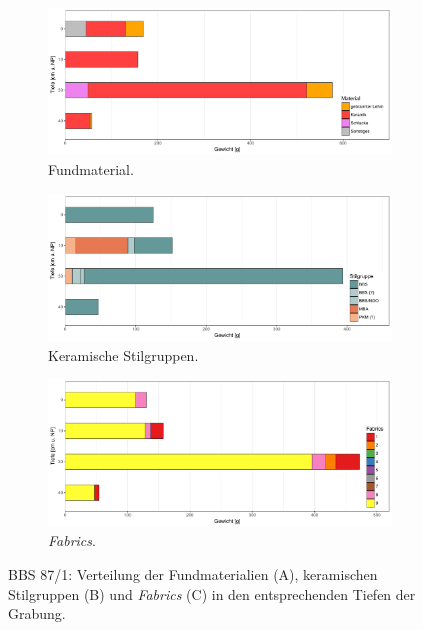 \begin{figure}[p]
	\centering
	\begin{subfigure}[t]{\textwidth}
		\centering
		\includegraphics[width=\textwidth]{fig/9-6_BBS87-1_VerteilungFunde_R.pdf}
		\caption{Fundmaterial.\vspace{1em}}
		\label{fig:BBS87-1_VerteilungFunde}
	\end{subfigure}
	\begin{subfigure}[t]{\textwidth}
		\centering
		\includegraphics[width=\textwidth]{fig/9-6_BBS87-1_KeramikStilgruppen_R.pdf}
		\caption{Keramische Stilgruppen.\vspace{1em}}
		\label{fig:BBS87-1_VerteilungStilgr}
	\end{subfigure}
	\begin{subfigure}[t]{\textwidth}
		\centering
		\includegraphics[width=\textwidth]{fig/9-6_BBS87-1_Fabrics_R.pdf}
		\caption{\textit{Fabrics}.}
		\label{fig:BBS87-1_VerteilungFabrics}
	\end{subfigure}
	\caption{BBS 87/1: Verteilung der Fundmaterialien (A), keramischen Stilgruppen (B) und \textit{Fabrics} (C) in den entsprechenden Tiefen der Grabung.}
	\label{fig:BBS87_1_Funde}
\end{figure}

